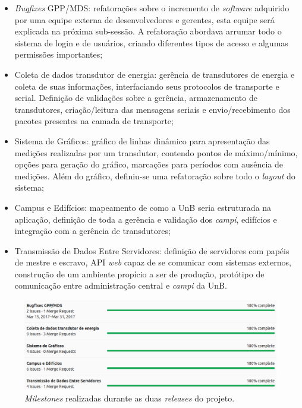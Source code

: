 \begin{itemize}
    \item \textit{Bugfixes} GPP/MDS: refatorações sobre o incremento de \textit{software} adquirido por uma equipe externa de desenvolvedores e gerentes, esta equipe será explicada na próxima sub-sessão. A refatoração abordava arrumar todo o sistema de login e de usuários, criando diferentes tipos de acesso e algumas permissões importantes;
    \item Coleta de dados transdutor de energia: gerência de transdutores de energia e coleta de suas informações, interfaciando seus protocolos de transporte e serial. Definição de validações sobre a gerência, armazenamento de transdutores, criação/leitura das mensagens seriais e envio/recebimento dos pacotes presentes na camada de transporte;
    \item Sistema de Gráficos: gráfico de linhas dinâmico para apresentação das medições realizadas por um transdutor, contendo pontos de máximo/mínimo, opções para geração do gráfico, marcações para períodos com ausência de medições. Além do gráfico, definiu-se uma refatoração sobre todo o \textit{layout} do sistema;
    \item Campus e Edifícios: mapeamento de como a UnB seria estruturada na aplicação, definição de toda a gerência e validação dos \textit{campi}, edifícios e integração com a gerência de transdutores;
    \item Transmissão de Dados Entre Servidores: definição de servidores com papéis de mestre e escravo, API \textit{web} capaz de se comunicar com sistemas externos, construção de um ambiente propício a ser de produção, protótipo de comunicação entre administração central e \textit{campi} da UnB.
\end{itemize}

\begin{figure}[!htb]
    \centering
    \includegraphics[keepaspectratio=true,scale=0.51]{figuras/milestones.eps}
    \caption{\textit{Milestones} realizadas durante as duas \textit{releases} do projeto.}
    \label{milestones}
\end{figure}


